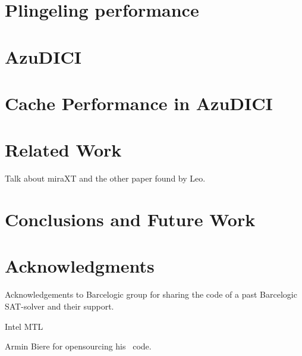 \documentclass{article}
\begin{document}
\section{Plingeling performance}



\section{AzuDICI}
\label{sec:azudici}



\section{Cache Performance in AzuDICI}



\section{Related Work}



Talk about miraXT and the other paper found by Leo.

\section{Conclusions and Future Work}



\section*{Acknowledgments}

Acknowledgements to Barcelogic group for sharing the code of a past
Barcelogic SAT-solver and their support.

Intel MTL

Armin Biere for opensourcing his \pling\ code.




\end{document}
